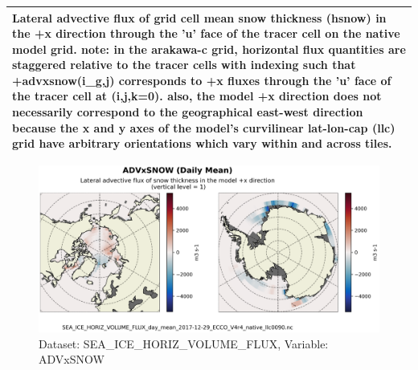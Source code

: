 \begin{longtable}{|m{}|m{}|m{}|m{}|}
\multicolumn{4}{|p{1\textwidth}|}{\footnotesize{{Lateral advective flux of grid cell mean snow thickness (hsnow) in the +x direction through the 'u' face of the tracer cell on the native model grid. note: in the arakawa-c grid, horizontal flux quantities are staggered relative to the tracer cells with indexing such that +advxsnow(i\_g,j) corresponds to +x fluxes through the 'u' face of the tracer cell at (i,j,k=0). also, the model +x direction does not necessarily correspond to the geographical east-west direction because the x and y axes of the model's curvilinear lat-lon-cap (llc) grid have arbitrary orientations which vary within and across tiles.}}} \\ \hline
\end{longtable}

\begin{figure}[H]
\centering
\includegraphics[scale=0.55]{../images/plots/native_plots/Sea-Ice_and_Snow_Horizontal_Volume_Fluxes/ADVxSNOW.png}
\caption{Dataset: SEA\_ICE\_HORIZ\_VOLUME\_FLUX, Variable: ADVxSNOW}
\label{tab:table-SEA_ICE_HORIZ_VOLUME_FLUX_ADVxSNOW-Plot}
\end{figure}
\newpage
\pagebreak
